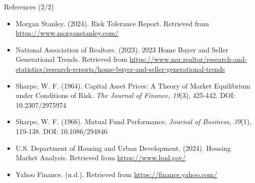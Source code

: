 \documentclass{beamer}
\begin{document}
\begin{frame}{References (2/2)}
    \begin{block}{}
        \begin{itemize}
            \item Morgan Stanley. (2024). Risk Tolerance Report. Retrieved from \url{https://www.morganstanley.com/}
            \item National Association of Realtors. (2023). 2023 Home Buyer and Seller Generational Trends. Retrieved from \url{https://www.nar.realtor/research-and-statistics/research-reports/home-buyer-and-seller-generational-trends}
            \item Sharpe, W. F. (1964). Capital Asset Prices: A Theory of Market Equilibrium under Conditions of Risk. \textit{The Journal of Finance, 19}(3), 425-442. DOI: 10.2307/2975974
            \item Sharpe, W. F. (1966). Mutual Fund Performance. \textit{Journal of Business, 39}(1), 119-138. DOI: 10.1086/294846
            \item U.S. Department of Housing and Urban Development. (2024). Housing Market Analysis. Retrieved from \url{https://www.hud.gov/}
            \item Yahoo Finance. (n.d.). Retrieved from \url{https://finance.yahoo.com/}
        \end{itemize}
    \end{block}
\end{frame}
\end{document}

